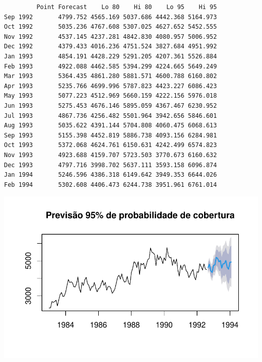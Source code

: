 \documentclass[
  letterpaper,
  DIV=11,
  numbers=noendperiod]{scrartcl}
\begin{document}
\begin{verbatim}
         Point Forecast    Lo 80    Hi 80    Lo 95    Hi 95
Sep 1992       4799.752 4565.169 5037.686 4442.368 5164.973
Oct 1992       5035.236 4767.608 5307.025 4627.652 5452.555
Nov 1992       4537.145 4237.281 4842.830 4080.957 5006.952
Dec 1992       4379.433 4016.236 4751.524 3827.684 4951.992
Jan 1993       4854.191 4428.229 5291.205 4207.361 5526.884
Feb 1993       4922.088 4462.585 5394.299 4224.665 5649.249
Mar 1993       5364.435 4861.280 5881.571 4600.788 6160.802
Apr 1993       5235.766 4699.996 5787.823 4423.227 6086.423
May 1993       5077.223 4512.969 5660.159 4222.156 5976.018
Jun 1993       5275.453 4676.146 5895.059 4367.467 6230.952
Jul 1993       4867.736 4256.482 5501.964 3942.656 5846.601
Aug 1993       5035.622 4391.144 5704.808 4060.475 6068.613
Sep 1993       5155.398 4452.819 5886.738 4093.156 6284.981
Oct 1993       5372.068 4624.761 6150.631 4242.499 6574.823
Nov 1993       4923.688 4159.707 5723.503 3770.673 6160.632
Dec 1993       4797.716 3998.702 5637.111 3593.158 6096.874
Jan 1994       5246.596 4386.318 6149.642 3949.353 6644.026
Feb 1994       5302.608 4406.473 6244.738 3951.961 6761.014
\end{verbatim}

\includegraphics{T2_grupo5_files/figure-pdf/previsao-pontual-3.pdf}
\end{document}
